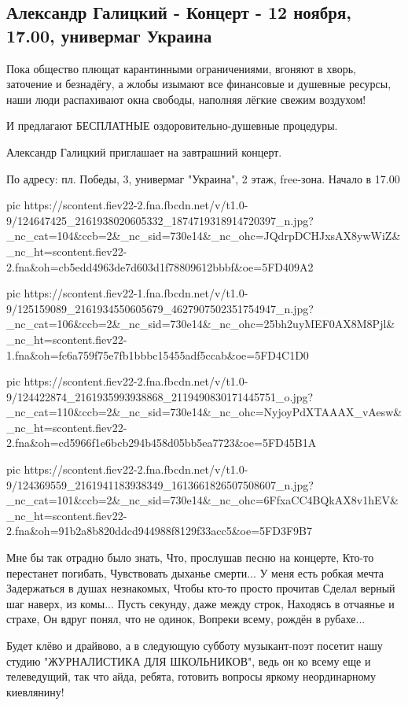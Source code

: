  
 
 

\subsection{Александр Галицкий - Концерт - 12 ноября, 17.00, универмаг Украина}
\label{sec:11_11_2020.fb.roman_balashev.1.alexander_galickii_concert}

Пока общество плющат карантинными ограничениями, вгоняют в хворь, заточение и
безнадёгу, а жлобы изымают все финансовые и душевные ресурсы, наши люди
распахивают окна свободы, наполняя лёгкие свежим воздухом! 

И предлагают БЕСПЛАТНЫЕ оздоровительно-душевные процедуры. 

Александр Галицкий приглашает на завтрашний концерт. 

По адресу: пл. Победы, 3, универмаг "Украина", 2 этаж, free-зона. Начало в 17.00

\ifcmt
pic https://scontent.fiev22-2.fna.fbcdn.net/v/t1.0-9/124647425_2161938020605332_1874719318914720397_n.jpg?_nc_cat=104&ccb=2&_nc_sid=730e14&_nc_ohc=JQdrpDCHJxsAX8ywWiZ&_nc_ht=scontent.fiev22-2.fna&oh=cb5edd4963de7d603d1f78809612bbbf&oe=5FD409A2

pic https://scontent.fiev22-1.fna.fbcdn.net/v/t1.0-9/125159089_2161934550605679_4627907502351754947_n.jpg?_nc_cat=106&ccb=2&_nc_sid=730e14&_nc_ohc=25bh2uyMEF0AX8M8Pjl&_nc_ht=scontent.fiev22-1.fna&oh=fc6a759f75e7fb1bbbc15455adf5ccab&oe=5FD4C1D0

pic https://scontent.fiev22-2.fna.fbcdn.net/v/t1.0-9/124422874_2161935993938868_2119490830171445751_o.jpg?_nc_cat=110&ccb=2&_nc_sid=730e14&_nc_ohc=NyjoyPdXTAAAX_vAesw&_nc_ht=scontent.fiev22-2.fna&oh=cd5966f1e6bcb294b458d05bb5ea7723&oe=5FD45B1A

pic https://scontent.fiev22-2.fna.fbcdn.net/v/t1.0-9/124369559_2161941183938349_1613661826507508607_n.jpg?_nc_cat=101&ccb=2&_nc_sid=730e14&_nc_ohc=6FfxaCC4BQkAX8v1hEV&_nc_ht=scontent.fiev22-2.fna&oh=91b2a8b820ddcd944988f8129f33acc5&oe=5FD3F9B7
\fi

\obeycr
Мне бы так отрадно было знать,
Что, прослушав песню на концерте,
Кто-то перестанет погибать,
Чувствовать дыханье смерти...
У меня есть робкая мечта
Задержаться в душах незнакомых,
Чтобы кто-то просто прочитав
Сделал верный шаг наверх, из комы...
Пусть секунду, даже между строк,
Находясь в отчаянье и страхе,
Он вдруг понял, что не одинок,
Вопреки всему, рождён в рубахе...
\restorecr

Будет клёво и драйвово, а в следующую субботу музыкант-поэт посетит нашу студию
"ЖУРНАЛИСТИКА ДЛЯ ШКОЛЬНИКОВ", ведь он ко всему еще и телеведущий, так что
айда, ребята, готовить вопросы яркому неординарному киевлянину!

